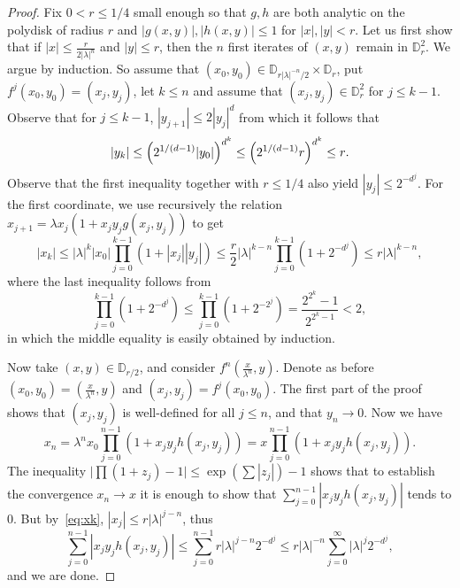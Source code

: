 \documentclass[11 pt, oneside, a4paper]{amsart}
\newcommand{\D}{\mathbb{D}}
\newcommand{\abs}[1]{{\left|{#1}\right|}}
\newcommand{\lrpar}[1]{\left(#1\right)}
\theoremstyle{definition}
\theoremstyle{definition}
\begin{document}
\begin{proof}
Fix $0<r\leq 1/4$ small enough so that $g, h$ are both analytic on the polydisk of radius $r$ and
$|g (x,y) |, |h (x,y) | \le 1$ for   $|x|, |y| <r$. 
Let us first show that   if $\abs{x}\leq \frac{r}{2\abs{\lambda}^n}$ and $\abs{y}\leq r$, 
then the $n$ first iterates of $(x,y)$ remain in $\D_r^2$. We argue by induction. So assume that $(x_0,y_0)\in \D_{r\abs{\lambda}^{-n}/2}\times \D_r$, 
put $f^j(x_0,y_0) = (x_j, y_j)$, let $k\leq n$  and assume that $(x_j, y_j)\in \D_r^2$ for $j\leq k-1$.  
Observe that for $j\leq k-1$, $\abs{y_{j+1}}\leq 2\abs{y_j}^d$ from which it follows that  
$$\abs{y_k}\leq \lrpar{2^{1/(d-1)} \abs{y_0}}^{d^k} \leq   \lrpar{2^{1/(d-1)} r}^{d^k} \leq r\text.$$
Observe that  the first inequality together with 
 $r\leq 1/4$ also yield $\abs{y_j}\leq 2^{-d^j}$. 
For the first coordinate, we use recursively the relation 
$x_{j+1} = \lambda x_j (1+x_j y_j g(x_j, y_j))$ to get 
\begin{equation}\label{eq:xk}
\abs{x_k} \leq \abs{\lambda}^k \abs{x_0}\prod_{j=0}^{k-1} \lrpar{1+ \abs{x_j} \abs{y_j}} \leq 
\frac{r}{2} \abs{\lambda}^{k-n} \prod_{j=0}^{k-1} \lrpar{1+  2^{-d^j}} \leq r\abs{\lambda}^{k-n} ,
\end{equation}
where the last inequality follows from 
$$ \prod_{j=0}^{k-1} \lrpar{1+  2^{-d^j}} \leq \prod_{j=0}^{k-1} \lrpar{1+  2^{-2^j}} = \frac{2^{2^k}-1}{2^{2^k-1}} < 2,$$
in which the middle equality is easily obtained by induction.

Now take   $(x,y) \in \D_{r/2}$, and consider 
$f^n(\frac{x}{\lambda^n} , y)$. Denote as before $(x_0 , y_0)  = (\frac{x}{\lambda^n} , y)$ and 
$(x_j, y_j) = f^j(x_0, y_0)$.
The first part of the proof shows that $(x_j, y_j)$
is well-defined for all $j\leq n$, and that $y_n\to 0$.  Now we have 
$$x_n =  \lambda^n x_0 \prod_{j=0}^{n-1} \lrpar{1+x_jy_j h(x_j, y_j)} = x 
\prod_{j=0}^{n-1} \lrpar{1+x_jy_j h(x_j, y_j)}. $$
The inequality 
$\big|\prod (1+z_j) - 1\big| \leq \exp \lrpar{\sum \abs{z_j}} - 1$ shows that to establish the convergence $x_n\to x$ it is enough to show that $\sum_{j=0}^{n-1} \abs{x_jy_j h(x_j, y_j)}$ tends to 0.
But by~\eqref{eq:xk}, $\abs{x_j}\leq r \abs{\lambda}^{j-n}$, thus 
$$\sum_{j=0}^{n-1} \abs{x_j y_j h(x_j, y_j)} \leq \sum_{j=0}^{n-1} r \abs{\lambda}^{j-n} 2^{-d^j} \leq r\abs{\lambda}^{-n} \sum_{j=0}^\infty \abs{\lambda}^{j} 2^{-d^j},$$ and we are done.
\end{proof}
\end{document}
